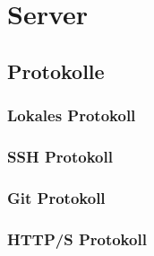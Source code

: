 \chapter{Server}
\section{Protokolle}
\subsection{Lokales Protokoll}
\subsection{SSH Protokoll}
\subsection{Git Protokoll}
\subsection{HTTP/S Protokoll}



